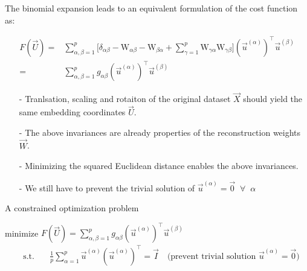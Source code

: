 \begin{frame}
The binomial expansion leads to an equivalent formulation of the cost function as:

\svspace{-5mm}

\begin{align}
F(\vec{U}) =& 
\sum_{\alpha, \beta=1}^{p}
\Big\lbrack
\delta_{\alpha \beta} - \mathrm{W}_{\alpha \beta} - \mathrm{W}_{\beta \alpha} + \sum_{\gamma=1}^{p} \mathrm{W}_{\gamma \alpha} \mathrm{W}_{\gamma \beta} \Big\rbrack (\vec{u}^{(\alpha)})^\top \vec{u}^{(\beta)} \\
=& \sum_{\alpha, \beta=1}^{p} g_{\alpha \beta} (\vec{u}^{(\alpha)})^\top \vec{u}^{(\beta)}
\end{align}


\pause

\svspace{-3mm
}
\begin{itemize}
\item[-] Tranlsation, scaling and rotaiton of the original dataset $\vec X$ should yield the same embedding coordinates $\vec U$.
\item[-] The above invariances are already properties of the reconstruction weights $\vec W$.
\item[-] Minimizing the squared Euclidean distance enables the above invariances.
\item[-] We still have to prevent the trivial solution of $\vec u^{(\alpha)} = \vec 0 \;\; \forall \;\; \alpha$
\end{itemize}

\end{frame}

\begin{frame}{A constrained optimization problem}

minimize $F(\vec{U}) = \sum_{\alpha, \beta=1}^{p} g_{\alpha \beta} (\vec{u}^{(\alpha)})^\top \vec{u}^{(\beta)}$
\begin{align}
\quad \text{s.t.} \quad
&\frac{1}{p} \sum_{\alpha=1}^{p} \vec{u}^{(\alpha)} (\vec{u}^{(\alpha)})^\top = \vec{I} \quad \text{(prevent trivial solution } \vec{u}^{(\alpha)} = \vec{0})
\end{align}

\end{frame}

